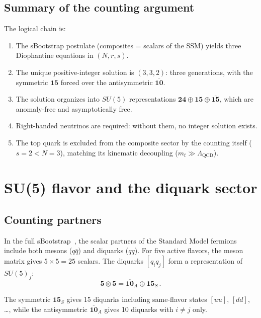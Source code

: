 \documentclass[12pt,a4paper]{article}
\begin{document}
\subsection{Summary of the counting argument}
The logical chain is:
\begin{enumerate}
\item The sBootstrap postulate (composites = scalars of the SSM)
yields three Diophantine equations in $(N, r, s)$.
\item The unique positive-integer solution is $(3, 3, 2)$:
three generations, with the symmetric $\mathbf{15}$ forced over
the antisymmetric $\overline{\mathbf{10}}$.
\item The solution organizes into $SU(5)$ representations
$\mathbf{24} \oplus \mathbf{15} \oplus \overline{\mathbf{15}}$,
which are anomaly-free and asymptotically free.
\item Right-handed neutrinos are required: without them, no
integer solution exists.
\item The top quark is excluded from the composite sector by
the counting itself ($s = 2 < N = 3$), matching its
kinematic decoupling ($m_t \gg \Lambda_{\text{QCD}}$).
\end{enumerate}


\section{SU(5) flavor and the diquark sector}
\label{sec:diquarks}

\subsection{Counting partners}

In the full sBootstrap~\cite{Rivero2005}, the scalar partners of
the Standard Model fermions include both mesons ($q\bar{q}$) and
diquarks ($qq$). For five active flavors, the meson matrix gives
$5 \times 5 = 25$ scalars. The diquarks $[q_i q_j]$ form a
representation of $SU(5)_f$:
\begin{equation}
\mathbf{5} \otimes \mathbf{5} = \overline{\mathbf{10}}_A
\oplus \mathbf{15}_S\,.
\end{equation}

The symmetric $\mathbf{15}_S$ gives 15 diquarks including
same-flavor states $[uu]$, $[dd]$, \ldots, while the antisymmetric
$\overline{\mathbf{10}}_A$ gives 10 diquarks with $i \neq j$ only.
\end{document}
